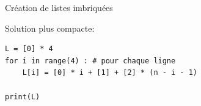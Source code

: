 \documentclass[10pt]{beamer}
\begin{document}
\begin{frame}[fragile]{Création de listes imbriquées}

Solution plus compacte: 


\begin{exampleblock}{}
\begin{verbatim}
L = [0] * 4
for i in range(4) : # pour chaque ligne
    L[i] = [0] * i + [1] + [2] * (n - i - 1)

print(L)
\end{verbatim}
\end{exampleblock}

\end{frame}
\end{document}
